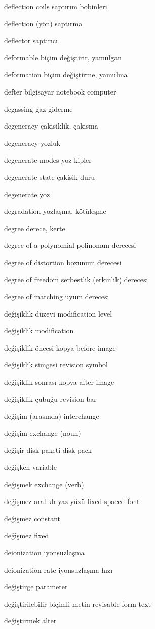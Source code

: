 \documentclass[12pt,fleqn]{article}\usepackage{../../common}
\begin{document}
deflection coils saptırım bobinleri

deflection (yön) saptırma

deflector saptırıcı

deformable biçim değiştirir, yamulgan

deformation biçim değiştirme, yamulma

defter bilgisayar notebook computer

degassing gaz giderme

degeneracy çakisiklik, çakisma

degeneracy yozluk

degenerate modes yoz kipler

degenerate state çakisik duru

degenerate yoz

degradation yozlaşma, kötüleşme

degree derece, kerte

degree of a polynomial polinomun derecesi

degree of distortion bozunum derecesi

degree of freedom serbestlik (erkinlik) derecesi

degree of matching uyum derecesi

değişiklik düzeyi modification level

değişiklik modification

değişiklik öncesi kopya before-image

değişiklik simgesi revision symbol

değişiklik sonrası kopya after-image

değişiklik çubuğu revision bar

değişim (arasında) interchange

değişim exchange (noun)

değişir disk paketi disk pack

değişken variable

değişmek exchange (verb)

değişmez aralıklı yazıyüzü fixed spaced font

değişmez constant

değişmez fixed

deionization iyonsuzlaşma

deionization rate iyonsuzlaşma hızı

değiştirge parameter

değiştirilebilir biçimli metin revisable-form text

değiştirmek alter
\end{document}
